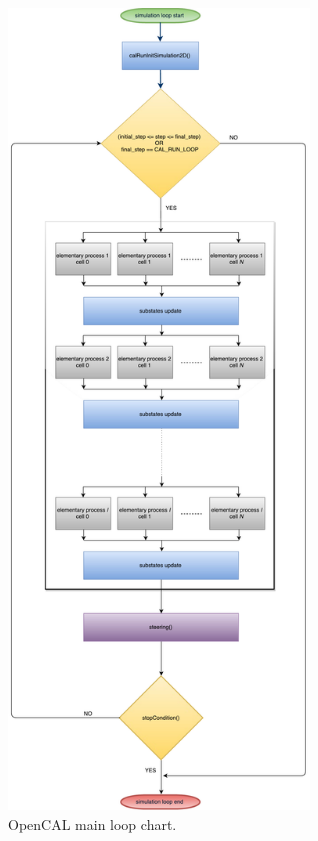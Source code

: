 \begin{figure}[htbp]
  \centering
  \includegraphics[width=8cm]{./images/OpenCAL/opencal_main_loop.pdf}
  \caption{OpenCAL main loop chart.}
  \label{fig:opencal_main_loop}
\end{figure}


